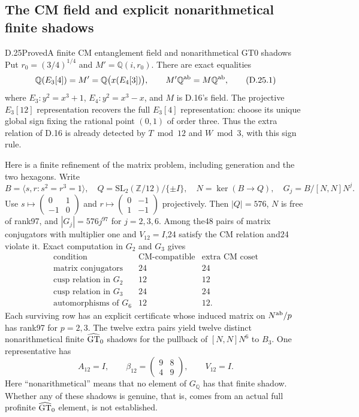 \subsection{The CM field and explicit nonarithmetical finite shadows}

\begin{statement}{D.25}{Proved}{A finite CM entanglement field and nonarithmetical GT0 shadows}
Put $r_0=(3/4)^{1/4}$ and $M'=\mathbb Q(i,r_0)$. There are exact equalities
\[
 \mathbb Q(E_3[4])=M'=\mathbb Q\bigl(x(E_4[3])\bigr),\qquad
 M'\mathbb Q^{\rm ab}=M\mathbb Q^{\rm ab},                  \tag{D.25.1}
\]
where $E_3:y^2=x^3+1$, $E_4:y^2=x^3-x$, and $M$ is D.16's field.
The projective $E_3[12]$ representation recovers the full $E_3[4]$
representation: choose its unique global sign fixing the rational
point $(0,1)$ of order three. Thus the extra relation of D.16 is
already detected by $T\bmod12$ and $W\bmod3$, with this sign rule.

Here is a finite refinement of the matrix problem, including
generation and the two hexagons. Write
\[
 B=\langle s,r:s^2=r^3=1\rangle,\quad
 Q=\mathrm{SL}_2(\mathbb Z/12)/\{\pm I\},\quad
 N=\ker(B\to Q),\quad G_j=B/[N,N]N^j.
\]
Use $s\mapsto\left(\begin{smallmatrix}0&1\\-1&0\end{smallmatrix}\right)$
and $r\mapsto\left(\begin{smallmatrix}0&-1\\1&-1\end{smallmatrix}\right)$
projectively. Then $|Q|=576$, $N$ is free of rank97, and
$|G_j|=576j^{97}$ for $j=2,3,6$.
Among the48 pairs of matrix conjugators with multiplier one and
$V_{12}=I$,24 satisfy the CM relation and24 violate it.
Exact computation in $G_2$ and $G_3$ gives
\[
\begin{array}{c|rr}
\text{condition}&\text{CM-compatible}&\text{extra CM coset}\\\hline
\text{matrix conjugators}&24&24\\
\text{cusp relation in }G_2&12&12\\
\text{cusp relation in }G_3&24&24\\
\text{automorphisms of }G_6&12&12.
\end{array}                                               \tag{D.25.2}
\]
Each surviving row has an explicit certificate whose induced
matrix on $N^{\rm ab}/p$ has rank97 for $p=2,3$.
The twelve extra pairs yield twelve distinct nonarithmetical
finite $\widehat{\rm GT}_0$ shadows for the pullback of
$[N,N]N^6$ to $B_3$. One representative has
\[
 A_{12}=I,\qquad
 \beta_{12}=\begin{pmatrix}9&8\\4&9\end{pmatrix},\qquad
 V_{12}=I.                                                \tag{D.25.3}
\]
Here ``nonarithmetical'' means that no element of $G_{\mathbb Q}$
has that finite shadow. Whether any of these shadows is genuine,
that is, comes from an actual full profinite
$\widehat{\rm GT}_0$ element, is not established.
\end{statement}
